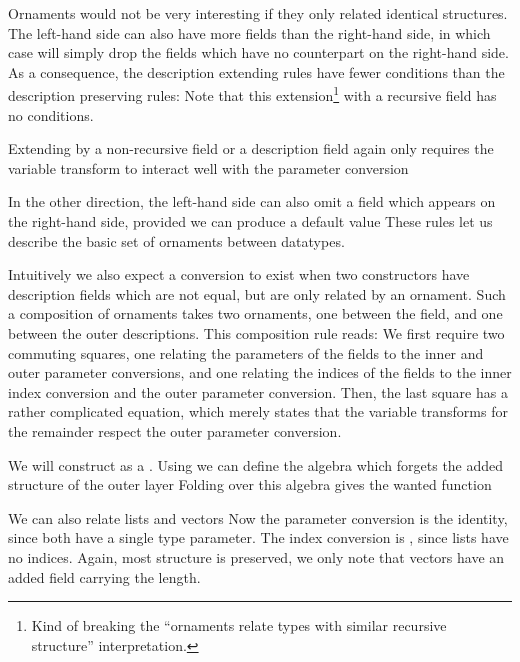 Ornaments would not be very interesting if they only related identical structures. The left-hand side can also have more fields than the right-hand side, in which case  will simply drop the fields which have no counterpart on the right-hand side. As a consequence, the description extending rules have fewer conditions than the description preserving rules: 
Note that this extension\footnote{Kind of breaking the ``ornaments relate types with similar recursive structure'' interpretation.} with a recursive field has no conditions.

Extending by a non-recursive field or a description field again only requires the variable transform to interact well with the parameter conversion

In the other direction, the left-hand side can also omit a field which appears on the right-hand side, provided we can produce a default value
These rules let us describe the basic set of ornaments between datatypes.

Intuitively we also expect a conversion to exist when two constructors have description fields which are not equal, but are only related by an ornament. Such a composition of ornaments takes two ornaments, one between the field, and one between the outer descriptions. This composition rule reads:
We first require two commuting squares, one relating the parameters of the fields to the inner and outer parameter conversions, and one relating the indices of the fields to the inner index conversion and the outer parameter conversion. Then, the last square has a rather complicated equation, which merely states that the variable transforms for the remainder respect the outer parameter conversion.

We will construct  as a . Using
we can define the algebra which forgets the added structure of the outer layer
Folding over this algebra gives the wanted function


We can also relate lists and vectors
Now the parameter conversion is the identity, since both have a single type parameter. The index conversion is \AgdaFunction{!}, since lists have no indices. Again, most structure is preserved, we only note that vectors have an added field carrying the length.

